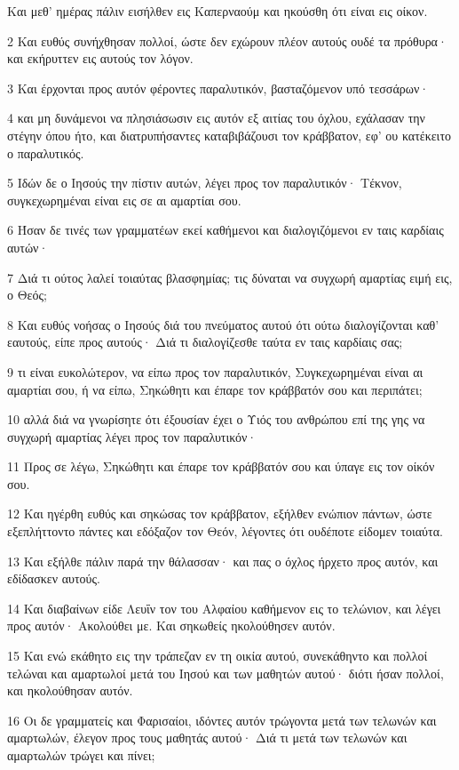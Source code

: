 \par Και μεθ' ημέρας πάλιν εισήλθεν εις Καπερναούμ και ηκούσθη ότι είναι εις οίκον.
\par 2 Και ευθύς συνήχθησαν πολλοί, ώστε δεν εχώρουν πλέον αυτούς ουδέ τα πρόθυρα· και εκήρυττεν εις αυτούς τον λόγον.
\par 3 Και έρχονται προς αυτόν φέροντες παραλυτικόν, βασταζόμενον υπό τεσσάρων·
\par 4 και μη δυνάμενοι να πλησιάσωσιν εις αυτόν εξ αιτίας του όχλου, εχάλασαν την στέγην όπου ήτο, και διατρυπήσαντες καταβιβάζουσι τον κράββατον, εφ' ου κατέκειτο ο παραλυτικός.
\par 5 Ιδών δε ο Ιησούς την πίστιν αυτών, λέγει προς τον παραλυτικόν· Τέκνον, συγκεχωρημέναι είναι εις σε αι αμαρτίαι σου.
\par 6 Ήσαν δε τινές των γραμματέων εκεί καθήμενοι και διαλογιζόμενοι εν ταις καρδίαις αυτών·
\par 7 Διά τι ούτος λαλεί τοιαύτας βλασφημίας; τις δύναται να συγχωρή αμαρτίας ειμή εις, ο Θεός;
\par 8 Και ευθύς νοήσας ο Ιησούς διά του πνεύματος αυτού ότι ούτω διαλογίζονται καθ' εαυτούς, είπε προς αυτούς· Διά τι διαλογίζεσθε ταύτα εν ταις καρδίαις σας;
\par 9 τι είναι ευκολώτερον, να είπω προς τον παραλυτικόν, Συγκεχωρημέναι είναι αι αμαρτίαι σου, ή να είπω, Σηκώθητι και έπαρε τον κράββατόν σου και περιπάτει;
\par 10 αλλά διά να γνωρίσητε ότι έξουσίαν έχει ο Υιός του ανθρώπου επί της γης να συγχωρή αμαρτίας λέγει προς τον παραλυτικόν·
\par 11 Προς σε λέγω, Σηκώθητι και έπαρε τον κράββατόν σου και ύπαγε εις τον οίκόν σου.
\par 12 Και ηγέρθη ευθύς και σηκώσας τον κράββατον, εξήλθεν ενώπιον πάντων, ώστε εξεπλήττοντο πάντες και εδόξαζον τον Θεόν, λέγοντες ότι ουδέποτε είδομεν τοιαύτα.
\par 13 Και εξήλθε πάλιν παρά την θάλασσαν· και πας ο όχλος ήρχετο προς αυτόν, και εδίδασκεν αυτούς.
\par 14 Και διαβαίνων είδε Λευΐν τον του Αλφαίου καθήμενον εις το τελώνιον, και λέγει προς αυτόν· Ακολούθει με. Και σηκωθείς ηκολούθησεν αυτόν.
\par 15 Και ενώ εκάθητο εις την τράπεζαν εν τη οικία αυτού, συνεκάθηντο και πολλοί τελώναι και αμαρτωλοί μετά του Ιησού και των μαθητών αυτού· διότι ήσαν πολλοί, και ηκολούθησαν αυτόν.
\par 16 Οι δε γραμματείς και Φαρισαίοι, ιδόντες αυτόν τρώγοντα μετά των τελωνών και αμαρτωλών, έλεγον προς τους μαθητάς αυτού· Διά τι μετά των τελωνών και αμαρτωλών τρώγει και πίνει;
